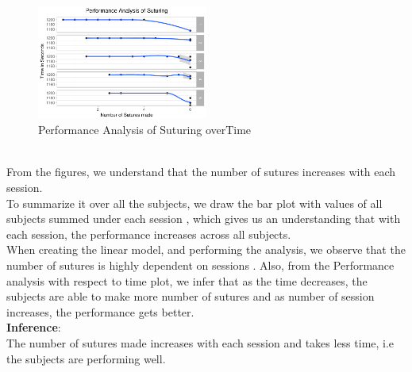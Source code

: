 \documentclass[12pt,epsf]{report}
\begin{document}
{\begin{figure}[!htb]
	\centering
	\includegraphics[width=0.5\textwidth]{SuturingVsTime.pdf}
	\caption{Performance Analysis of Suturing overTime }
	\centering
\end{figure}\\
From the figures, we understand that the number of sutures increases with each session. \\
To summarize it over all the subjects, we draw the bar plot with values of all subjects summed under each session , which gives us an understanding that with each session, the performance increases across all subjects.\\
When creating the linear model, and performing the analysis, we observe that the number of sutures is highly dependent on sessions .
Also, from the Performance analysis with respect to time plot, we infer that as the time decreases, the subjects are able to make more number of sutures and as number of session increases, the performance gets better.\\
\textbf{Inference}:\\
The number of sutures made increases with each session and takes less time, i.e the subjects are performing well.\\
\\
\FloatBarrier
}
\end{document}
